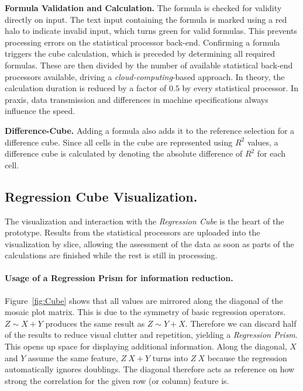 \documentclass[journal]{style/vgtc} 			          %
\newcommand{\com}[1]{\textcolor{orange}{\uline{#1}}}
\begin{document}
\textbf{Formula Validation and Calculation.} The formula is checked for validity directly on input.
The text input containing the formula is marked using a red halo to indicate invalid input, which turns green for valid formulas.
This prevents processing errors on the statistical processor back-end.
Confirming a formula triggers the cube calculation, which is preceded by determining all required formulas.
These are then divided by the number of available statistical back-end processors available, driving a \emph{cloud-computing}-based approach.
In theory, the calculation duration is reduced by a factor of $0.5$ by every statistical processor.
In praxis, data transmission and differences in machine specifications always influence the speed.

\textbf{Difference-Cube.}
Adding a formula also adds it to the reference selection for a difference cube.
Since all cells in the cube are represented using $R^2$ values, a difference cube is calculated by denoting the absolute difference of $R^2$ for each cell.


\subsection{Regression Cube Visualization.}
The visualization and interaction with the \emph{Regression Cube} is the heart of the prototype.
Results from the statistical processors are uploaded into the visualization by slice, allowing the assessment of the data as soon as parts of the calculations are finished while the rest is still in processing.

\paragraph{Usage of a Regression Prism for information reduction.}
Figure~\ref{fig:Cube} shows that all values are mirrored along the diagonal of the mosaic plot matrix.
This is due to the symmetry of basic regression operators.
$Z \sim X + Y$ produces the same result as $Z \sim Y + X$.
Therefore we can discard half of the results to reduce visual clutter and repetition, yielding a \emph{Regression Prism}.
This opens up space for displaying additional information.
Along the diagonal, $X$ and $Y$ assume the same feature, $Z ~ X + Y$ turns into $Z ~ X$ because the regression automatically ignores doublings.
The diagonal therefore acts as reference on how strong the correlation for the given row (or column) feature is.
\end{document}
